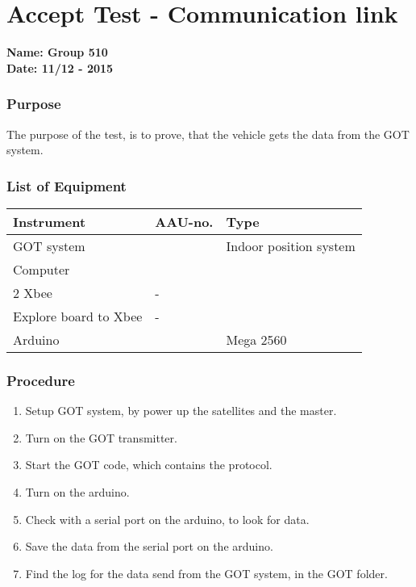 \pagebreak
\section{Accept Test - Communication link} \label{app:AccTes1}
\textbf{Name: Group 510}\\
\textbf{Date: 11/12 - 2015}

\subsubsection{Purpose}
The purpose of the test, is to prove, that the vehicle gets the data from the GOT system.

\subsubsection{List of Equipment}
\begin{table}[H]
\begin{tabular}{|l|l|p{4cm}|}
\hline%
  \textbf{Instrument}                        &  \textbf{AAU-no.}  &  \textbf{Type}       \\
\hline%
  GOT system                               &   &  Indoor position system  \\
\hline%
  Computer                   		         &   &    \\
\hline%
  2 Xbee &  -             &    \\
\hline%
  Explore board to Xbee                 &  -             &                      \\
\hline
 Arduino & & Mega 2560 \\
\hline
\end{tabular}
\end{table}

\subsubsection{Procedure}

\begin{enumerate}
  \item Setup GOT system, by power up the satellites and the master.
  \item Turn on the GOT transmitter.
  \item Start the GOT code, which contains the protocol.
  \item Turn on the arduino.
  \item Check with a serial port on the arduino, to look for data.
  \item Save the data from the serial port on the arduino.
  \item Find the log for the data send from the GOT system, in the GOT folder.
\end{enumerate}

